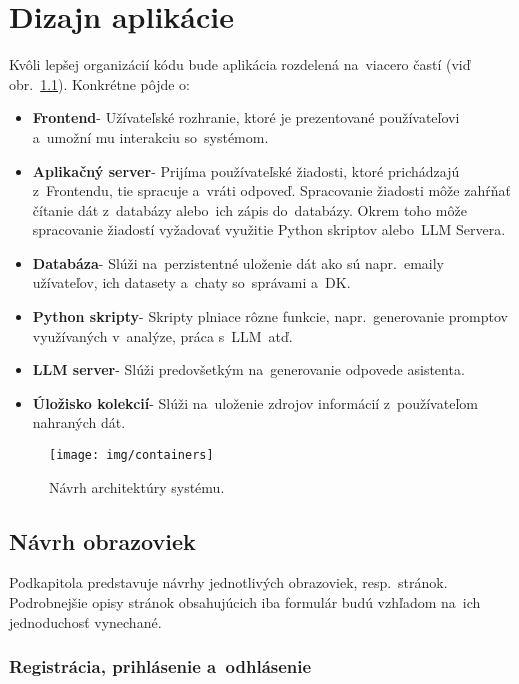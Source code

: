 \chapter{Dizajn aplikácie}

Kvôli lepšej organizácií kódu bude aplikácia rozdelená na~viacero častí (viď obr.~\ref{containers}). Konkrétne pôjde o:
\begin{itemize}
\item \textbf{Frontend}\-- Užívateľské rozhranie, ktoré je prezentované používateľovi a~u\-mo\-žní mu interakciu so~systémom.

\item \textbf{Aplikačný server}\-- Prijíma používateľské žiadosti, ktoré prichádzajú z~Frontendu, tie spracuje a~vráti odpoveď. Spracovanie žiadosti môže zahŕňať čítanie dát z~databázy alebo~ich zápis do~databázy. Okrem toho môže spracovanie žiadostí vyžadovať využitie Python skriptov alebo~LLM Servera.

\item \textbf{Databáza}\-- Slúži na~perzistentné uloženie dát ako sú napr.~emaily užívateľov, ich datasety a~chaty so~správami a~DK.

\item \textbf{Python skripty}\-- Skripty plniace rôzne funkcie, napr.~generovanie promptov využívaných v~analýze, práca s~LLM~atď.

\item \textbf{LLM server}\-- Slúži predovšetkým na~generovanie odpovede asistenta.

\item \textbf{Úložisko kolekcií}\-- Slúži na~uloženie zdrojov informácií z~používateľom nahraných dát.
\end{itemize}

\begin{figure}[H]\centering
\texttt{[image: img/containers]}
\caption{Návrh architektúry systému.}
\label{containers}
\end{figure}

\section{Návrh obrazoviek}

Podkapitola predstavuje návrhy jednotlivých obrazoviek, resp.~stránok. Podrobnejšie opisy stránok obsahujúcich iba formulár budú vzhľadom na~ich jednoduchosť vynechané.

\subsection{Registrácia, prihlásenie a~odhlásenie}

